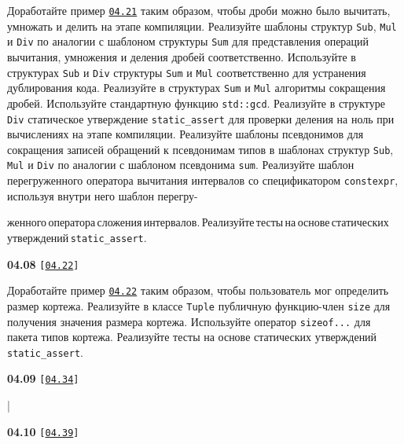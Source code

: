 \documentclass[a4paper,12pt]{article}
\begin{document}
Доработайте пример \href{https://github.com/i-s-m-mipt/Education/blob/master/projects/examples/source/04.21.cpp}{\texttt{04.21}} таким образом, чтобы дроби можно было вычитать, умножать и делить на этапе компиляции. Реализуйте шаблоны структур \lstinline{Sub}, \lstinline{Mul} и \lstinline{Div} по аналогии с шаблоном структуры \lstinline{Sum} для представления операций вычитания, умножения и деления дробей соответственно. Используйте в структурах \lstinline{Sub} и \lstinline{Div} структуры \lstinline{Sum} и \lstinline{Mul} соответственно для устранения дублирования кода. Реализуйте в структурах \lstinline{Sum} и \lstinline{Mul} алгоритмы сокращения дробей. Используйте стандартную функцию \lstinline{std::gcd}. Реализуйте в структуре \lstinline{Div} статическое утверждение \lstinline{static_assert} для проверки деления на ноль при вычислениях на этапе компиляции. Реализуйте шаблоны псевдонимов для сокращения записей обращений к псевдонимам типов в шаблонах структур \lstinline{Sub}, \lstinline{Mul} и \lstinline{Div} по аналогии с шаблоном псевдонима \lstinline{sum}. Реализуйте шаблон перегруженного оператора вычитания интервалов со спецификатором \lstinline{constexpr}, используя внутри него шаблон перегру-

женного\,оператора\,сложения\,интервалов.\,Реализуйте\,тесты\,на\,основе\,статических\,утверждений\,\lstinline{static_assert}.

\bigskip

{\large \textbf{04.08} \texttt{[\href{https://github.com/i-s-m-mipt/Education/blob/master/projects/examples/source/04.22.cpp}{\texttt{04.22}}]}}

\bigskip

Доработайте пример \href{https://github.com/i-s-m-mipt/Education/blob/master/projects/examples/source/04.22.cpp}{\texttt{04.22}} таким образом, чтобы пользователь мог определить размер кортежа. Реализуйте в классе \lstinline{Tuple} публичную функцию-член \lstinline{size} для получения значения размера кортежа. Используйте оператор \lstinline{sizeof...} для пакета типов кортежа. Реализуйте тесты на основе статических утверждений \lstinline{static_assert}.

\bigskip

{\large \textbf{04.09} \texttt{[\href{https://github.com/i-s-m-mipt/Education/blob/master/projects/examples/source/04.34.cpp}{\texttt{04.34}}]}}

\bigskip

|

\bigskip

{\large \textbf{04.10} \texttt{[\href{https://github.com/i-s-m-mipt/Education/blob/master/projects/examples/source/04.39.cpp}{\texttt{04.39}}]}}
\end{document}
